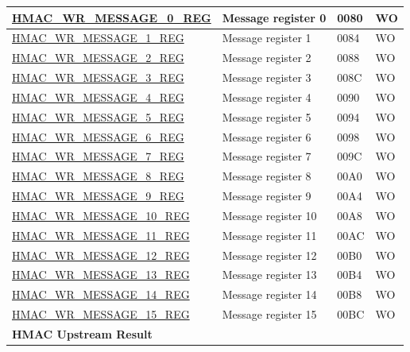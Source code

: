 \begin{longtable}{ | p{6cm} | p{7.2cm} | p{1.3cm} | p{1cm} | }
\hyperref[regdesc:HMACWRMESSAGENREG]{HMAC\_WR\_MESSAGE\_0\_REG} & Message register 0 & \hexprefix{}0080 & WO \\ \hline
\hyperref[regdesc:HMACWRMESSAGENREG]{HMAC\_WR\_MESSAGE\_1\_REG} & Message register 1 & \hexprefix{}0084 & WO \\ \hline
\hyperref[regdesc:HMACWRMESSAGENREG]{HMAC\_WR\_MESSAGE\_2\_REG} & Message register 2 & \hexprefix{}0088 & WO \\ \hline
\hyperref[regdesc:HMACWRMESSAGENREG]{HMAC\_WR\_MESSAGE\_3\_REG} & Message register 3 & \hexprefix{}008C & WO \\ \hline
\hyperref[regdesc:HMACWRMESSAGENREG]{HMAC\_WR\_MESSAGE\_4\_REG} & Message register 4 & \hexprefix{}0090 & WO \\ \hline
\hyperref[regdesc:HMACWRMESSAGENREG]{HMAC\_WR\_MESSAGE\_5\_REG} & Message register 5 & \hexprefix{}0094 & WO \\ \hline
\hyperref[regdesc:HMACWRMESSAGENREG]{HMAC\_WR\_MESSAGE\_6\_REG} & Message register 6 & \hexprefix{}0098 & WO \\ \hline
\hyperref[regdesc:HMACWRMESSAGENREG]{HMAC\_WR\_MESSAGE\_7\_REG} & Message register 7 & \hexprefix{}009C & WO \\ \hline
\hyperref[regdesc:HMACWRMESSAGENREG]{HMAC\_WR\_MESSAGE\_8\_REG} & Message register 8 & \hexprefix{}00A0 & WO \\ \hline
\hyperref[regdesc:HMACWRMESSAGENREG]{HMAC\_WR\_MESSAGE\_9\_REG} & Message register 9 & \hexprefix{}00A4 & WO \\ \hline
\hyperref[regdesc:HMACWRMESSAGENREG]{HMAC\_WR\_MESSAGE\_10\_REG} & Message register 10 & \hexprefix{}00A8 & WO \\ \hline
\hyperref[regdesc:HMACWRMESSAGENREG]{HMAC\_WR\_MESSAGE\_11\_REG} & Message register 11 & \hexprefix{}00AC & WO \\ \hline
\hyperref[regdesc:HMACWRMESSAGENREG]{HMAC\_WR\_MESSAGE\_12\_REG} & Message register 12 & \hexprefix{}00B0 & WO \\ \hline
\hyperref[regdesc:HMACWRMESSAGENREG]{HMAC\_WR\_MESSAGE\_13\_REG} & Message register 13 & \hexprefix{}00B4 & WO \\ \hline
\hyperref[regdesc:HMACWRMESSAGENREG]{HMAC\_WR\_MESSAGE\_14\_REG} & Message register 14 & \hexprefix{}00B8 & WO \\ \hline
\hyperref[regdesc:HMACWRMESSAGENREG]{HMAC\_WR\_MESSAGE\_15\_REG} & Message register 15 & \hexprefix{}00BC & WO \\ \hline
\multicolumn{4}{|l|}{\textbf{HMAC Upstream Result}} \\ \hline

\end{longtable}
